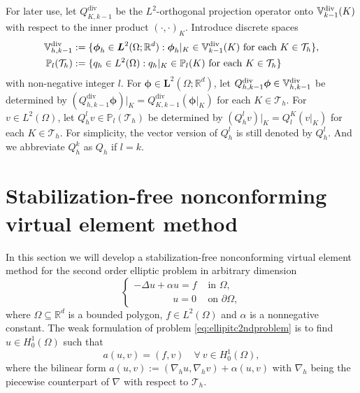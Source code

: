 \documentclass[10pt]{amsart}
\renewcommand{\div}{\operatorname{div}}
\numberwithin{equation}{section}
\begin{document}
For later use, let $Q_{K,k-1}^{\div}$ be the $L^2$-orthogonal projection operator onto $\mathbb{V}_{k-1}^{\rm div}(K)$ with respect to the inner product $(\cdot, \cdot)_K$.
Introduce discrete spaces
\begin{align*}
\mathbb{V}_{h,k-1}^{\rm div}&:=\{\boldsymbol{\phi}_h\in \boldsymbol{L}^2(\Omega;\mathbb R^d): \boldsymbol{\phi}_h|_K\in \mathbb{V}_{k-1}^{\rm div}(K) \textrm{ for each } K\in\mathcal T_h\}, \\
\mathbb P_l(\mathcal T_h)&:=\{q_h\in L^2(\Omega): q_h|_K\in \mathbb P_l(K) \textrm{ for each } K\in\mathcal T_h\}
\end{align*}
with non-negative integer $l$.
For $\boldsymbol{\phi}\in\boldsymbol{L}^2(\Omega;\mathbb R^d)$, let $Q_{h,k-1}^{\div}\boldsymbol{\phi}\in\mathbb{V}_{h,k-1}^{\rm div}$ be determined by $(Q_{h,k-1}^{\div}\boldsymbol{\phi})|_K=Q_{K,k-1}^{\div}(\boldsymbol{\phi}|_K)$ for each $K\in\mathcal T_h$. For $v\in L^2(\Omega)$, let $Q_h^lv\in \mathbb P_l(\mathcal T_h)$ be determined by $(Q_h^{l}v)|_K=Q_{l}^K(v|_K)$ for each $K\in\mathcal T_h$. For simplicity, the vector version of $Q_h^l$ is still denoted by $Q_h^l$. And we abbreviate $Q_h^k$ as $Q_h$ if $l=k$.




\section{Stabilization-free nonconforming virtual element method}\label{sec:stabfreencfmvem}


In this section we will develop a stabilization-free nonconforming virtual element method for the second order elliptic problem in arbitrary dimension
\begin{equation}\label{eq:ellipitc2ndproblem}
\begin{cases}
-\Delta u + \alpha u=f & \textrm{ in } \Omega,\\
\qquad\qquad u=0&\textrm{ on } \partial\Omega,
\end{cases}
\end{equation}
where $\Omega\subseteq\mathbb R^d$ is a bounded polygon, $f\in L^2(\Omega)$ and $\alpha$ is a nonnegative constant. The weak formulation of problem \eqref{eq:ellipitc2ndproblem} is to find $u\in H_0^1(\Omega)$ such that
\begin{equation}\label{eq:ellipitc2ndproblemweakform}
a(u,v)=(f,v)\quad\forall~v\in H_0^1(\Omega),
\end{equation}
where the bilinear form $a(u, v):=(\nabla_h u, \nabla_h v)+\alpha(u,v)$ with $\nabla_h$ being the piecewise counterpart of $\nabla$ with respect to $\mathcal T_h$.
\end{document}

